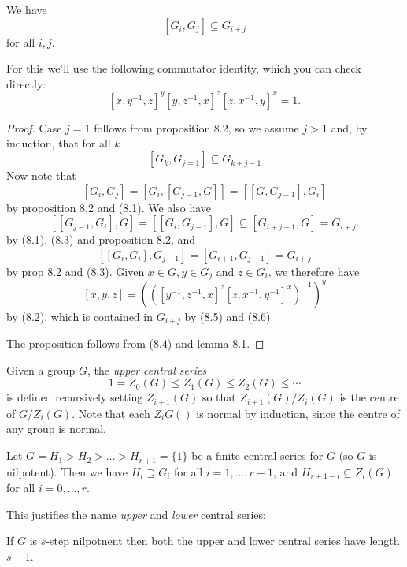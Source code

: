 \documentclass[a4paper]{article}
\begin{document}
\begin{proposition}[prop 8.4]
  We have
  \[
    [G_i, G_j] \subseteq G_{i + j}
  \]
  for all \(i, j\).
\end{proposition}

For this we'll use the following commutator identity, which you can check directly:
\[
  [x, y^{-1}, z]^y [y, z^{-1}, x]^z [z, x^{-1}, y]^x = 1.
  \tag{8.2}
\]

\begin{proof}
  Case \(j = 1\) follows from proposition 8.2, so we assume \(j > 1\) and, by induction, that for all \(k\)
  \[
    [G_k, G_{j = 1}] \subseteq G_{k + j - 1}
    \tag{8.3}
  \]
  Now note that
  \[
    [G_i, G_j] = [G_i, [G_{j - 1}, G]] = [[G, G_{j - 1}], G_i]
    \tag{8.4}
  \]
  by proposition 8.2 and (8.1). We also have
  \[
    [[G_{j - 1}, G_i], G] = [[G_i, G_{j - 1}], G] \subseteq [G_{i + j - 1}, G] = G_{i + j}.
    \tag{8.5}
  \]
  by (8.1), (8.3) and proposition 8.2, and
  \[
    [[G_i, G_i], G_{j - 1}] = [G_{i + 1}, G_{j - 1}] = G_{i + j}
  \]
  by prop 8.2 and (8.3). Given \(x \in G, y \in G_j\) and \(z \in G_i\), we therefore have
  \[
    [x, y, z] = (([y^{-1}, z^{-1}, x]^z [z, x^{-1}, y^{-1}]^x)^{-1})^y
  \]
  by (8.2), which is contained in \(G_{i + j}\) by (8.5) and (8.6).

  The proposition follows from (8.4) and lemma 8.1.
\end{proof}

\begin{definition}
  Given a group \(G\), the \emph{upper central series}
  \[
    1 = Z_0(G) \leq Z_1(G) \leq Z_2(G) \leq \cdots
  \]
  is defined recursively setting \(Z_{i + 1}(G)\) so that \(Z_{i + 1}(G)/Z_i(G)\) is the centre of \(G/Z_i(G)\). Note that each \(Z_iG()\) is normal by induction, since the centre of any group is normal.
\end{definition}

\begin{proposition}[prop 8.5]
  Let \(G = H_1 > H_2 > \dots > H_{r + 1} = \{1\}\) be a finite central series for \(G\) (so \(G\) is nilpotent). Then we have \(H_i \supseteq G_i\) for all \(i = 1, \dots, r + 1\), and \(H_{r + 1 - i} \subseteq Z_i(G)\) for all \(i = 0, \dots, r\).
\end{proposition}

This justifies the name \emph{upper} and \emph{lower} central series:

\begin{corollary}
  If \(G\) is \(s\)-step nilpotnent then both the upper and lower central series have length \(s - 1\).
\end{corollary}
\end{document}
